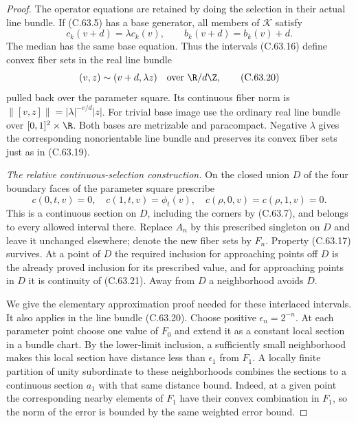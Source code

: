 \begin{proof}
The operator equations are retained by doing
the selection in their actual line bundle.
If (C.63.5) has a base generator, all members
of $\mathcal K$ satisfy
\[
 c_k(v+d)=\lambda c_k(v),\qquad
 b_k(v+d)=b_k(v)+d.                                    \tag{C.63.19}
\]
The median has the same base equation.
Thus the intervals (C.63.16) define convex
fiber sets in the real line bundle
\[
 (v,z)\sim(v+d,\lambda z)
       \quad\hbox{over }\R/d\Z,                       \tag{C.63.20}
\]
pulled back over the parameter square.
Its continuous fiber norm is
$\|[v,z]\|=|\lambda|^{-v/d}|z|$.
For trivial base image use the ordinary real
line bundle over $[0,1]^2\times\R$.
Both bases are metrizable and paracompact.
Negative $\lambda$ gives the corresponding
nonorientable line bundle and preserves its
convex fiber sets just as in (C.63.19).

\emph{The relative continuous-selection construction.}
On the closed union $D$ of the four boundary
faces of the parameter square prescribe
\[
 c(0,t,v)=0,\quad c(1,t,v)=\phi_t(v),\quad
 c(\rho,0,v)=c(\rho,1,v)=0.                            \tag{C.63.21}
\]
This is a continuous section on $D$, including
the corners by (C.63.7), and belongs to every
allowed interval there. Replace $A_n$ by this
prescribed singleton on $D$ and leave it
unchanged elsewhere; denote the new fiber
sets by $F_n$. Property (C.63.17) survives.
At a point of $D$ the required inclusion for
approaching points off $D$ is the already
proved inclusion for its prescribed value,
and for approaching points in $D$ it is
continuity of (C.63.21). Away from $D$ a
neighborhood avoids $D$.

We give the elementary approximation proof
needed for these interlaced intervals. It
also applies in the line bundle (C.63.20).
Choose positive $\epsilon_n=2^{-n}$.
At each parameter point choose one value
of $F_0$ and extend it as a constant local
section in a bundle chart. By the lower-limit
inclusion, a sufficiently small neighborhood
makes this local section have distance less
than $\epsilon_1$ from $F_1$.
A locally finite partition of unity subordinate
to these neighborhoods combines the sections
to a continuous section $a_1$ with that same
distance bound. Indeed, at a given point the
corresponding nearby elements of $F_1$ have
their convex combination in $F_1$, so the
norm of the error is bounded by the same
weighted error bound.


\end{proof}
